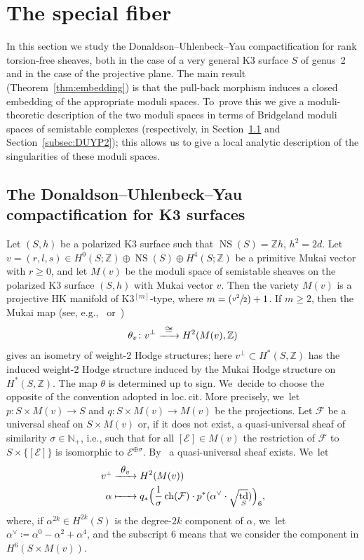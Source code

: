 \documentclass[11pt]{article}
\newcommand{\ie}{i.e.,\xspace}
\newcommand{\Subsection}{\subsection}
\newcommand\To[1]{\mathchoice{\xrightarrow{\textstyle\kern4pt#1\kern3pt}}{\stackrel{#1}{\longrightarrow}}{}{}}
\newcommand\Mto[1]{\mathrel{\mapstochar\To{#1}}}
\newcommand{\Psfrac}[2]{(\sfrac{#1}{#2})}
\newcommand{\HK}{\textup{HK}\xspace}
\let\oldbot\bot
\renewcommand{\bot}{{\scriptscriptstyle\oldbot}}
\newcommand{\NN}{{\mathbb N}}
\newcommand{\ZZ}{{\mathbb Z}}\let\Z\ZZ
\newcommand\cE{\mathcal{E}}
\newcommand\cF{\mathcal{F}}
\DeclareMathOperator{\ch}{ch}
\DeclareMathOperator{\NS}{NS}
\DeclareMathOperator{\td}{td}
\theoremstyle{definition}
\begin{document}
\section{The special fiber}\label{sec:SpecialFiber}

In this section we study the Donaldson--Uhlenbeck--Yau compactification for rank torsion-free sheaves, both in the case of a very general K3 surface $S$ of genus~2 and in the case of the projective plane. The main result (Theorem~\ref{thm:embedding}) is that the pull-back morphism induces a closed embedding of the appropriate moduli spaces. To~prove this we give a moduli-theoretic description of the two moduli spaces in terms of Bridgeland moduli spaces of semistable complexes (respectively, in Section~\ref{subsec:DUYK3} and Section~\ref{subsec:DUYP2}); this allows us to give a local analytic description of the singularities of these moduli spaces.

\Subsection{The Donaldson--Uhlenbeck--Yau compactification for K3 surfaces}\label{subsec:DUYK3}

Let $(S,h)$ be a polarized K3 surface such that $\NS(S)=\ZZ h$, $h^2=2d$. Let $v=(r,l,s)\in H^0(S;\ZZ)\oplus\NS(S)\oplus H^4(S;\ZZ)$ be a primitive Mukai vector with $r\ge 0$, and let $M(v)$ be the moduli space of semistable sheaves on the polarized K3 surface $(S,h)$ with Mukai vector $v$.
Then the variety $M(v)$ is a projective \HK manifold of K3$^{[m]}$-type, where $m=\Psfrac{v^2}{2}+1$.
If $m\geq2$, then the Mukai map (see, e.g.,~\cite[Main\,Th.\,]{Kieran:weight2} or~\cite[Eq.\,(1.6)]{Yos:moduli})
\[
\theta_v\colon v^\perp \To{\cong} H^2(M(v),\ZZ)
\]
gives an isometry of weight-2 Hodge structures; here $v^\perp\subset H^*(S,\ZZ)$ has the induced weight-2 Hodge structure induced by the Mukai Hodge structure on $H^*(S,\ZZ)$. The map $\theta$ is determined up to sign. We~decide to choose the opposite of the convention adopted in loc.\,cit.
More precisely, we~let $p\colon S\times M(v)\to S$ and $q\colon S\times M(v)\to M(v)$ be the projections. Let $\cF$ be a universal sheaf on $S\times M(v)$ or, if it does not exist, a quasi-universal sheaf of similarity $\sigma\in\NN_{+}$, \ie such that for all $[\cE]\in M(v)$ the restriction of $\cF$ to $S\times\{[\cE]\}$ is isomorphic to $\cE^{\oplus\sigma}$. By~\cite[Th.\,A.5]{Mukai:Tata}
a quasi-universal sheaf exists. We~let
\begin{equation}\label{mappatheta}
\begin{aligned}
v^{\bot} & \To{\theta_v} H^2(M(v)) \\
\alpha & \Mto{\hphantom{\theta_v}} q_{*}\Bigl(\frac{1}{\sigma}\ch(\cF)\cdot p^{*}(\alpha^{\vee}\cdot\sqrt{\td_S})\Bigr)_6,
\end{aligned}
\end{equation}
where, if $\alpha^{2k}\in H^{2k}(S)$ is the degree-$2k$ component of $\alpha$, we~let
$\alpha^{\vee}\coloneqq \alpha^0-\alpha^2+\alpha^4$, and the subscript $6$ means that we consider the component in $H^6(S\times M(v))$.
\end{document}
